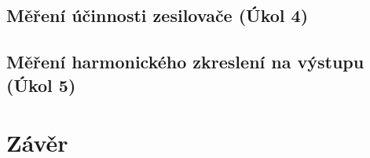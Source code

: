 \documentclass[a4paper, czech]{article}
\begin{document}
\subsection{Měření účinnosti zesilovače (Úkol 4)}

\subsection{Měření harmonického zkreslení na výstupu (Úkol 5)}

\section{Závěr}
\end{document}
